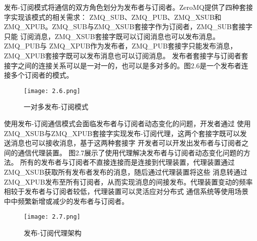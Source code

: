 发布-订阅模式将通信的双方角色划分为发布者与订阅者。ZeroMQ提供了四种套接字实现该模式的相关需求：
ZMQ\_SUB、ZMQ\_PUB、ZMQ\_XSUB和ZMQ\_XPUB。ZMQ\_SUB与ZMQ\_XSUB套接字作为订阅者，ZMQ\_SUB套接字只能
订阅消息，ZMQ\_XSUB套接字既可以订阅消息也可以发布消息。ZMQ\_PUB与
ZMQ\_XPUB作为发布者，ZMQ\_PUB套接字只能发布消息，ZMQ\_XPUB套接字既可以发布消息也可以订阅消息。
发布者套接字与订阅者套接字之间的连接关系可以是一对一的，也可以是多对多的。图2.6是一个发布者连接多个订阅者的模式。
\begin{figure}[H]
  \centering
  \texttt{[image: 2.6.png]}
  \caption{一对多发布-订阅模式}
  \label{fig:9}
\end{figure}

使用发布-订阅通信模式会面临发布者与订阅者动态变化的问题，开发者通过
使用ZMQ\_XSUB与ZMQ\_XPUB套接字实现发布-订阅代理，这两个套接字既可以发送消息也可以接收消息，基于这两种套接字
开发者可以开发出发布者与订阅者之间的通信代理装置。
图2.7展示了使用代理解决发布者与订阅者动态变化问题的方法。
所有的发布者与订阅者不直接连接而是连接到代理装置，代理装置通过ZMQ\_XSUB获取所有发布者发布的消息，随后通过代理装置将这些
消息转通过ZMQ\_XPUB发布至所有订阅者，从而实现消息的间接发布。代理装置变动的频率相较于发布者与订阅者较低，代理装置可以灵活应对分布式
通信系统等使用场景中中频繁新增或减少的发布者与订阅者。
\begin{figure}[H]
  \centering
  \texttt{[image: 2.7.png]}
  \caption{发布-订阅代理架构}
  \label{fig:10}
\end{figure}

